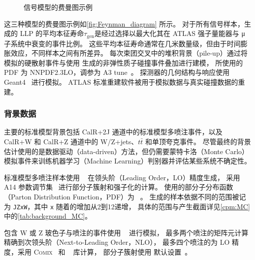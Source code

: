 \begin{figure}[ht]
    \centering
    \hfill
    \hfill
    \caption{信号模型的费曼图示例\cite{ATLAS:2022zhj}}
    \label{fig:Feynman_diagram}
\end{figure}

这三种模型的费曼图示例如\autoref{fig:Feynman_diagram} 所示。
对于所有信号样本，生成的 LLP 的平均本征寿命$\tau_{\text{gen}}$是经过选择以最大化其在 ATLAS 强子量能器与 μ 子系统中衰变的事件比例。
这些平均本征寿命通常在几米数量级，但由于时间膨胀效应，不同样本之间有所差异。
每次束团交叉中的堆积背景（pile-up）通过将模拟的硬散射事件与使用  生成的非弹性质子碰撞事件叠加进行建模，
所使用的 PDF 为 NNPDF2.3LO，调参为 A3 tune~\cite{ATL-PHYS-PUB-2016-017}。
探测器的几何结构与响应使用 Geant4~\cite{GEANT4:2002zbu} 进行模拟。
ATLAS 标准重建软件被用于模拟数据与真实碰撞数据的重建。

\subsubsection{背景数据}
主要的标准模型背景包括 CalR+2J 通道中的标准模型多喷注事件，以及 CalR+W 和 CalR+Z 通道中的 W/Z+jets、$t\bar{t}$ 和单顶夸克事件。
尽管最终的背景估计使用的是数据驱动（data-driven）方法，但仍需要蒙特卡洛（Monte Carlo）模拟事件来训练机器学习（Machine Learning）判别器并评估某些系统不确定性。

标准模型多喷注样本使用 ~\cite{pythia} 在领头阶（Leading Order，LO）精度生成，
采用 A14 参数调节集~\cite{Pythia_tunes} 进行部分子簇射和强子化的计算。
使用的部分子分布函数（Parton Distribution Function，PDF）为 \NNPDF[2.3lo]~\cite{parton_PDF}。
生成的样本依据不同的\pt 范围被记为 \texttt{JZxW}，其中 \texttt{x} 随着\pt 的增加从2到12递增，
具体的\pt 范围与产生截面详见\autoref{cpm:MC} 中的\autoref{tab:background_MC}。

包含 W 或 Z 玻色子与喷注的事件使用 \Sherpa[v2.2.1]~\cite{Sherpa} 进行模拟，
最多两个喷注的矩阵元计算精确到次领头阶（Next-to-Leading Order，NLO），
最多四个喷注的为 LO 精度，采用 \textsc{Comix}~\cite{Comix} 和 \OPENLOOPS~\cite{Open_Loops} 库计算，
部分子簇射使用 \Sherpa 默认设置~\cite{parton_shower}。

